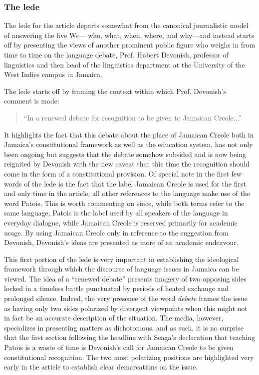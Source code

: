 \documentclass[output=paper,colorlinks,citecolor=brown]{langscibook}
\begin{document}
\subsubsection{The lede}

The lede for the article departs somewhat from the canonical journalistic model of answering the five Ws— who, what, when, where, and why—and instead starts off by presenting the views of another prominent public figure who weighs in from time to time on the language debate, Prof. Hubert Devonish, professor of linguistics and then head of the linguistics department at the University of the West Indies campus in Jamaica.
 
The lede starts off by framing the context within which Prof. Devonish’s comment is made: 

\begin{quote}
    “In a renewed debate for recognition to be given to Jamaican Creole...”
\end{quote}

It highlights the fact that this debate about the place of Jamaican Creole both in Jamaica’s constitutional framework as well as the education system, has not only been ongoing but suggests that the debate somehow subsided and is now being reignited by Devonish with the new caveat that this time the recognition should come in the form of a constitutional provision. Of special note in the first few words of the lede is the fact that the label Jamaican Creole is used for the first and only time in the article, all other references to the language make use of the word Patois. This is worth commenting on since, while both terms refer to the same language, Patois is the label used by all speakers of the language in everyday dialogue, while Jamaican Creole is reserved primarily for academic usage. By using Jamaican Creole only in reference to the suggestion from Devonish, Devonish’s ideas are presented as more of an academic endeavour. 

This first portion of the lede is very important in establishing the ideological framework through which the discourse of language issues in Jamaica can be viewed. The idea of a “renewed debate” presents imagery of two opposing sides locked in a timeless battle punctuated by periods of heated exchange and prolonged silence. Indeed, the very presence of the word \emph{debate} frames the issue as having only two sides polarized by divergent viewpoints when this might not in fact be an accurate description of the situation. The media, however, specializes in presenting matters as dichotomous, and as such, it is no surprise that the first section following the headline with Seaga’s declaration that teaching Patois is a waste of time is Devonish’s call for Jamaican Creole to be given constitutional recognition.  The two most polarizing positions are highlighted very early in the article to establish clear demarcations on the issue. 
\end{document}
